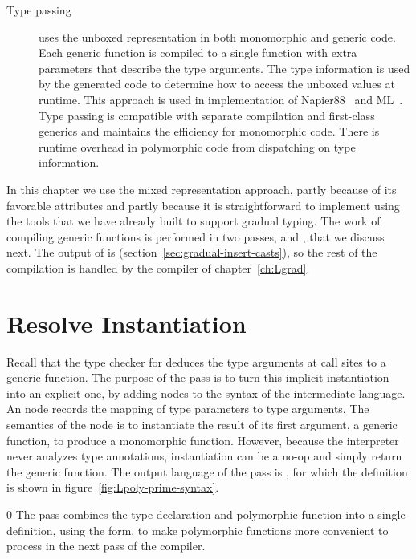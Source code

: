 \documentclass[7x10]{TimesAPriori_MIT}%
\def\racketEd{0}
\providecommand{\BookEdition}{1}
\let\edition\BookEdition
\numberwithin{theorem}{chapter}
\numberwithin{definition}{chapter}
\numberwithin{equation}{chapter}
\begin{document}
\begin{description}
\item[Type passing] uses the unboxed representation in both
  monomorphic and generic code. Each generic function is compiled to a
  single function with extra parameters that describe the type
  arguments. The type information is used by the generated code to
  determine how to access the unboxed values at runtime. This approach is
  used in implementation of Napier88~\citep{Morrison:1991aa} and
  ML~\citep{Harper:1995um}.  Type passing is compatible with separate
  compilation and first-class generics and maintains the
  efficiency for monomorphic code. There is runtime overhead in
  polymorphic code from dispatching on type information.
\end{description}

In this chapter we use the mixed representation approach, partly
because of its favorable attributes and partly because it is
straightforward to implement using the tools that we have already
built to support gradual typing. The work of compiling generic
functions is performed in two passes,  and
, that we discuss next. The output of
 is \LangCast{}
(section~\ref{sec:gradual-insert-casts}), so the rest of the
compilation is handled by the compiler of chapter~\ref{ch:Lgrad}.

\section{Resolve Instantiation}
\label{sec:generic-resolve}

Recall that the type checker for \LangPoly{} deduces the type
arguments at call sites to a generic function. The purpose of the
 pass is to turn this implicit instantiation into an
explicit one, by adding  nodes to the syntax of the
intermediate language.  An  node records the mapping of
type parameters to type arguments. The semantics of the 
node is to instantiate the result of its first argument, a generic
function, to produce a monomorphic function. However, because the
interpreter never analyzes type annotations, instantiation can be a
no-op and simply return the generic function.
%
The output language of the  pass is \LangInst{},
for which the definition is shown in figure~\ref{fig:Lpoly-prime-syntax}.

{\if\edition\racketEd    
The  pass combines the type declaration and polymorphic
function into a single definition, using the  form, to make
polymorphic functions more convenient to process in the next pass of the
compiler.
\fi}
\end{document}
